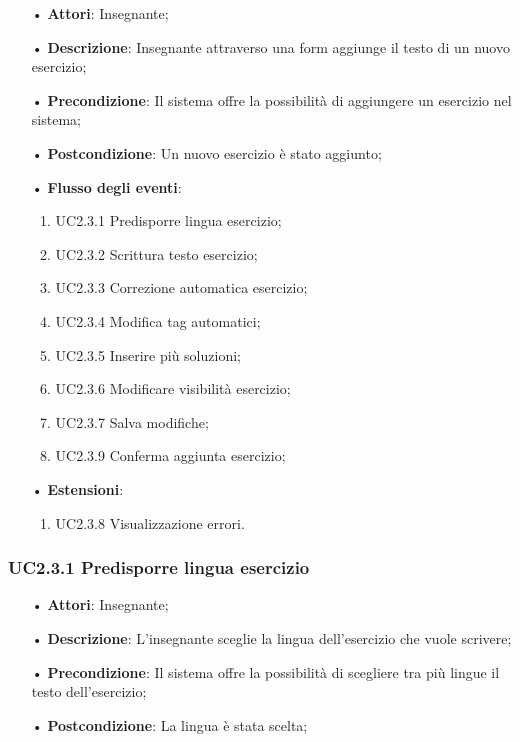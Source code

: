 \begin{itemize}
	\item[•] \textbf{Attori}: Insegnante;
	\item[•] \textbf{Descrizione}: Insegnante attraverso una form aggiunge il testo di un nuovo esercizio;
	\item[•] \textbf{Precondizione}: Il sistema offre la possibilità di aggiungere un esercizio nel sistema;
	\item[•] \textbf{Postcondizione}: Un nuovo esercizio è stato aggiunto;
	\item[•] \textbf{Flusso degli eventi}:
	\begin{enumerate}
		\item UC2.3.1 Predisporre lingua esercizio;
		\item UC2.3.2 Scrittura testo esercizio;
		\item UC2.3.3 Correzione automatica esercizio;
		\item UC2.3.4 Modifica tag automatici;
		\item UC2.3.5 Inserire più soluzioni;
		\item UC2.3.6 Modificare visibilità esercizio;
		\item UC2.3.7 Salva modifiche;
		\item UC2.3.9 Conferma aggiunta esercizio;
	\end{enumerate}
	\item[•] \textbf{Estensioni}:	
	\begin{enumerate}
		\item UC2.3.8 Visualizzazione errori.
	\end{enumerate}
\end{itemize}

\subsubsection{UC2.3.1 Predisporre lingua esercizio}
\begin{itemize}
	\item[•] \textbf{Attori}: Insegnante;
	\item[•] \textbf{Descrizione}: L'insegnante sceglie la lingua dell’esercizio che vuole scrivere;
	\item[•] \textbf{Precondizione}: Il sistema offre la possibilità di scegliere tra più lingue il testo 
			dell’esercizio;
	\item[•] \textbf{Postcondizione}: La lingua è stata scelta;
\end{itemize}




